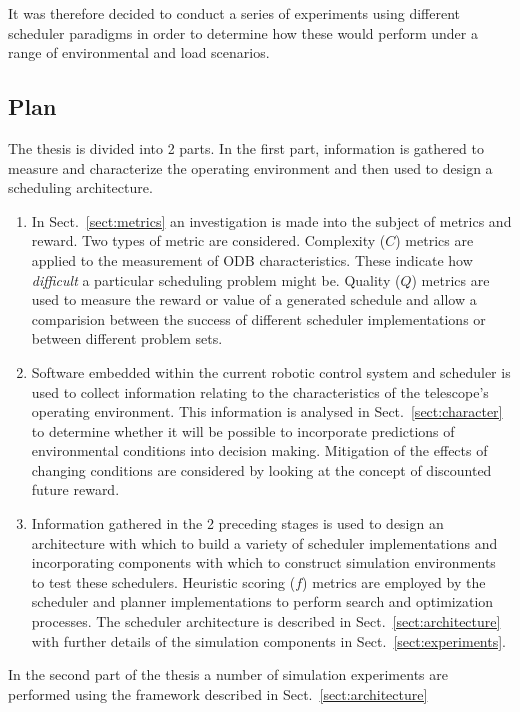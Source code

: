 It was therefore decided to conduct a series of experiments using different scheduler paradigms in order to determine how these would perform under a range of environmental and load scenarios.

\subsection{Plan}

The thesis is divided into 2 parts. In the first part, information is gathered to measure and characterize the operating environment and then used to design a scheduling architecture. 

\begin{enumerate}
\item In Sect.~\ref{sect:metrics} an investigation is made into the subject of metrics and reward. Two types of metric are considered. Complexity ($C$) metrics are applied to the measurement of ODB characteristics. These indicate how \emph{difficult} a particular scheduling problem might be. Quality ($Q$) metrics are used to measure the reward or value of a generated schedule and allow a comparision between the success of different scheduler implementations or between different problem sets. 

\item Software embedded within the current robotic control system and scheduler is used to collect information relating to the characteristics of the telescope's operating environment. This information is analysed in Sect.~\ref{sect:character} to determine whether it will be possible to incorporate predictions of environmental conditions into decision making. Mitigation of the effects of changing conditions are considered by looking at the concept of discounted future reward.

\item Information gathered in the 2 preceding stages is used to design an architecture with which to build a variety of scheduler implementations and incorporating components with which to construct simulation environments to test these schedulers. Heuristic scoring ($f$) metrics are employed by the scheduler and planner implementations to perform search and optimization processes. The scheduler architecture is described in Sect.~\ref{sect:architecture} with further details of the simulation components in Sect.~\ref{sect:experiments}.
\end{enumerate}

In the second part of the thesis a number of simulation experiments are performed using the framework described in Sect.~\ref{sect:architecture}

